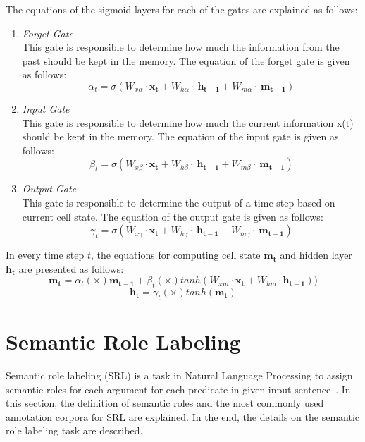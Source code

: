 The equations of the sigmoid layers for each of the gates are explained as follows:
\begin{enumerate}
	\item \textit{Forget Gate}\\
	This gate is responsible to determine how much the information from the past should be kept in the memory. The equation of the forget gate is given as follows:
	\begin{equation}\label{eq:forget_lstm}
	\alpha_{t}=\sigma(W_{x\alpha}\cdot \mathbf{x_{t}}+W_{h\alpha}\cdot~\mathbf{h_{t-1}}+W_{m\alpha}\cdot~\mathbf{m_{t-1}})
	\end{equation}
	
	\item \textit{Input Gate}\\
	This gate is responsible to determine how much the current information x(t) should be kept in the memory. The equation of the input gate is given as follows:
	\begin{equation}\label{eq:input_lstm}
	\beta_{t}=\sigma(W_{x\beta}\cdot \mathbf{x_{t}}+W_{h\beta}\cdot~\mathbf{h_{t-1}}+W_{m\beta}\cdot~\mathbf{m_{t-1}})
	\end{equation}
	
	\item \textit{Output Gate}\\
	This gate is responsible to determine the output of a time step based on current cell state. The equation of the output gate is given as follows:
	\begin{equation}\label{eq:output_lstm}
	\gamma_{t}=\sigma(W_{x\gamma}\cdot \mathbf{x_{t}}+W_{h\gamma}\cdot~\mathbf{h_{t-1}}+W_{m\gamma}\cdot~\mathbf{m_{t-1}})
	\end{equation}
	
\end{enumerate}

In every time step $t$, the equations for computing cell state $\mathbf{m_{t}}$ and hidden layer $\mathbf{h_{t}}$ are presented as follows:
\begin{equation}\label{eq:mt}
\mathbf{m_{t}}=\alpha_{t} (\times) \mathbf{m_{t-1}} + \beta_{t} (\times) tanh(W_{xm} \cdot \mathbf{x_{t}} + W_{hm} \cdot \mathbf{h_{t-1}}))
\end{equation}
\begin{equation}\label{eq:ht}
\mathbf{h_{t}}=\gamma_{t} (\times) tanh(\mathbf{m_{t}})
\end{equation}

\section{Semantic Role Labeling}
Semantic role labeling (SRL) is a task in Natural Language Processing to assign semantic roles for each argument for each predicate in given input sentence~\citep{jurafsky2016speech}. In this section, the definition of semantic roles and the most commonly used annotation corpora for SRL are explained. In the end, the details on the semantic role labeling task are described.


